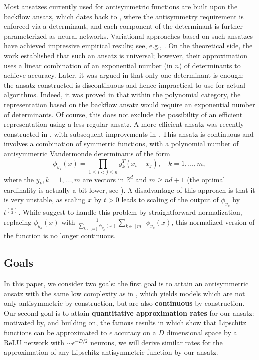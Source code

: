 \documentclass{amsart}
\theoremstyle{plain}
\theoremstyle{definition}
\theoremstyle{remark}
\newcommand{\RR}{\mathbb{R}}
\begin{document}
Most ansatzes currently used for antisymmetric functions are built upon the backflow ansatz, which dates back to \cite{feynman1956energy}, where the antisymmetry requirement is enforced via a determinant, and each component of the determinant is further parameterized as neural networks. Variational approaches based on such ansatzes have achieved impressive empirical results; see, e.g., \cites{han2019solving,pfau2020ab,hermann2020deep,choo2020fermionic}. 
On the theoretical side, the work \cite{han2019universal} established that such an ansatz is universal; however, their approximation uses a linear combination of an exponential number (in $n$) of determinants to achieve accuracy. Later, it was argued in \cite{hutter2020representing} that only one determinant is enough; the ansatz constructed is discontinuous and hence impractical to use for actual algorithms. Indeed, it was proved in \cite{huang2023geometry} that within the polynomial category, the representation based on the backflow ansatz would require an exponential number of determinants. 
Of course, this does not exclude the possibility of an efficient representation using a less regular ansatz. A more efficient ansatz was recently constructed in \cite{chen2023exact}, with subsequent improvements in \cite{ye2024widetilde}. 
This ansatz is continuous and  involves a combination of symmetric functions, with a polynomial number of antisymmetric Vandermonde determinants of the form 
\begin{equation}\label{eq:vandermonde}
\phi_{y_k}(x)=\prod_{1\leq i<j\leq n} y_k^T(x_i-x_j), \quad k=1,\ldots,m, \end{equation}
where the $y_k, k=1,\ldots,m$ are vectors in $\RR^d$ and $m\geq nd+1$ (the optimal cardinality is actually a bit lower, see \cite{frames}). A disadvantage of this approach is that it is very unstable, as scaling $x$ by $t>0$ leads to scaling of the output of $\phi_{y_k} $ by $t^{n \choose 2} $. While \cite{ye2024widetilde} suggest to handle this problem by straightforward normalization, replacing $\phi_{y_k}(x) $ with $\frac{1}{\sum_{k\in[m]}{\phi_{y_k}(x)}}\sum_{k \in [m]}{\phi_{y_k}(x)} $,
this normalized version of the function  is no longer  continuous.

\subsection{Goals} In this paper, we consider two goals: the first goal is to attain an antisymmetric ansatz with the same low complexity as in \cite{ye2024widetilde}, which yields models which are not only antisymmetric by construction, but are also \textbf{continuous} by construction. Our second goal is to attain \textbf{quantitative approximation rates} for our ansatz: motivated by, and building on, the famous results in \cite{approx_lip} which show that Lipschitz functions can be approximated to $\epsilon$ accuracy on a $D$ dimensional space by a ReLU network with $\sim \epsilon^{-D/2} $ neurons, we will derive similar rates for the approximation of any Lipschitz antisymmetric function by our ansatz.
\end{document}
